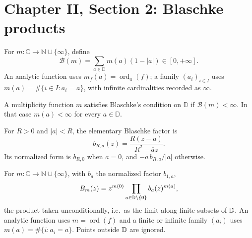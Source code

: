 \section{Chapter II, Section 2: Blaschke products}

\begin{definition}
  \label{def:blaschke_sum}
  \leanok
  For $m:\mathbb C\to\mathbb N\cup\{\infty\}$, define
  \[
    \mathcal B(m)=\sum_{a\in\mathbb D}m(a)(1-|a|)\in[0,+\infty].
  \]
  An analytic function uses $m_f(a)=\operatorname{ord}_a(f)$; a family
  $(a_i)_{i\in I}$ uses $m(a)=\#\{i\in I:a_i=a\}$, with infinite cardinalities
  recorded as $\infty$.
\end{definition}

\begin{definition}
  \label{def:blaschke_condition}
  \leanok
  A multiplicity function $m$ satisfies Blaschke's condition on $\mathbb D$
  if $\mathcal B(m)<\infty$. In that case $m(a)<\infty$ for every $a\in\mathbb D$.
\end{definition}

\begin{definition}
  \label{def:blaschke_factor}
  \leanok
  For $R>0$ and $|a|<R$, the elementary Blaschke factor is
  \[
    b_{R,a}(z)=\frac{R(z-a)}{R^2-\overline a z}.
  \]
  Its normalized form is $b_{R,0}$ when $a=0$, and
  $-\overline a\,b_{R,a}/|a|$ otherwise.
\end{definition}

\begin{definition}
  \label{def:blaschke_product}
  \leanok
  For $m:\mathbb C\to\mathbb N\cup\{\infty\}$, with $b_a$ the normalized factor
  $b_{1,a}$,
  \[
    B_m(z)=z^{m(0)}\prod_{a\in\mathbb{D}\setminus\{0\}}b_a(z)^{m(a)},
  \]
  the product taken unconditionally, i.e.\ as the limit along finite subsets of $\mathbb{D}$.
  An analytic function uses $m=\operatorname{ord}(f)$ and a finite or infinite
  family $(a_i)$ uses $m(a)=\#\{i:a_i=a\}$. Points outside $\mathbb{D}$ are ignored.
\end{definition}

